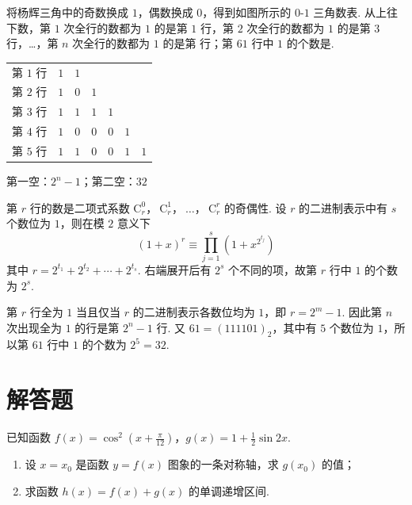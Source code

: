 \begin{problem}
将杨辉三角中的奇数换成 \(1\)，偶数换成 \(0\)，得到如图所示的 \(0\)-\(1\) 三角数表. 从上往下数，第 \(1\) 次全行的数都为 \(1\) 的是第 \(1\) 行，第 \(2\) 次全行的数都为 \(1\) 的是第 \(3\) 行，…，第 \(n\) 次全行的数都为 \(1\) 的是第\fillinblank{} 行；第 \(61\) 行中 \(1\) 的个数是\fillinblank{}.

\begin{center}
\begin{tabular}{c|cccccc}
第 \(1\) 行 & \(1\) & \(1\) \\
第 \(2\) 行 & \(1\) & \(0\) & \(1\) \\
第 \(3\) 行 & \(1\) & \(1\) & \(1\) & \(1\) \\
第 \(4\) 行 & \(1\) & \(0\) & \(0\) & \(0\) & \(1\) \\
第 \(5\) 行 & \(1\) & \(1\) & \(0\) & \(0\) & \(1\) & \(1\)
\end{tabular}
\end{center}
\end{problem}

\begin{answer}
第一空：\(2^n-1\)；第二空：\(32\)
\end{answer}

\begin{solution}
第 \(r\) 行的数是二项式系数
\(\mathrm C_r^0\)，\(\ \mathrm C_r^1\)，\(\ \ldots\)，\(\ \mathrm C_r^r\)
的奇偶性. 设 \(r\) 的二进制表示中有 \(s\) 个数位为 \(1\)，则在模 \(2\) 意义下
\[
(1+x)^r\equiv\prod_{j=1}^{s}\left(1+x^{2^{t_j}}\right)
\]
其中 \(r=2^{t_1}+2^{t_2}+\cdots+2^{t_s}\). 右端展开后有 \(2^s\) 个不同的项，故第 \(r\) 行中 \(1\) 的个数为 \(2^s\).

第 \(r\) 行全为 \(1\) 当且仅当 \(r\) 的二进制表示各数位均为 \(1\)，即 \(r=2^m-1\). 因此第 \(n\) 次出现全为 \(1\) 的行是第 \(2^n-1\) 行. 又 \(61=(111101)_2\)，其中有 \(5\) 个数位为 \(1\)，所以第 \(61\) 行中 \(1\) 的个数为 \(2^5=32\).
\end{solution}

\section{解答题}

\begin{problem}
已知函数 \(f(x) = \cos^2\left(x + \frac{\pi}{12}\right)\)，\(g(x) = 1 + \frac{1}{2}\sin 2x\).

\begin{enumerate}
\item 设 \(x = x_0\) 是函数 \(y = f(x)\) 图象的一条对称轴，求 \(g(x_0)\) 的值；
\item 求函数 \(h(x) = f(x) + g(x)\) 的单调递增区间.
\end{enumerate}
\end{problem}

